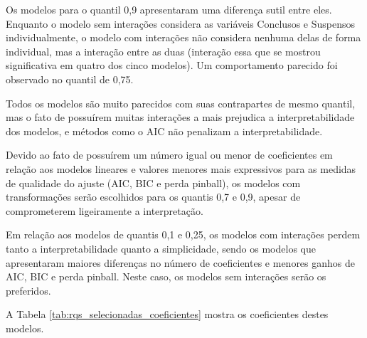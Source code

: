 Os modelos para o quantil 0,9 apresentaram uma diferença sutil entre eles. Enquanto o modelo sem interações considera as variáveis Conclusos e Suspensos individualmente, o modelo com interações não considera nenhuma delas de forma individual, mas a interação entre as duas (interação essa que se mostrou significativa em quatro dos cinco modelos). Um comportamento parecido foi observado no quantil de 0,75.

Todos os modelos são muito parecidos com suas contrapartes de mesmo quantil, mas o fato de possuírem muitas interações a mais prejudica a interpretabilidade dos modelos, e métodos como o AIC não penalizam a interpretabilidade.

Devido ao fato de possuírem um número igual ou menor de coeficientes em relação aos modelos lineares e valores menores mais expressivos para as medidas de qualidade do ajuste (AIC, BIC e perda pinball), os modelos com transformações serão escolhidos para os quantis 0,7 e 0,9, apesar de comprometerem ligeiramente a interpretação.

Em relação aos modelos de quantis 0,1 e 0,25, os modelos com interações perdem tanto a interpretabilidade quanto a simplicidade, sendo os modelos que apresentaram maiores diferenças no número de coeficientes e menores ganhos de AIC, BIC e perda pinball. Neste caso, os modelos sem interações serão os preferidos.

A Tabela \ref{tab:rqs_selecionadas_coeficientes} mostra os coeficientes destes modelos.

